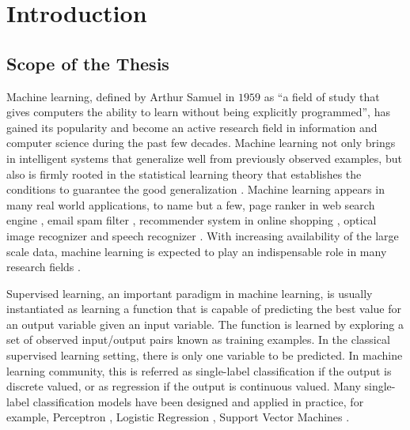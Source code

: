 




%
%
\chapter{Introduction}\label{ch_introduction}



%
%
\section{Scope of the Thesis}

Machine learning, defined by Arthur Samuel in $1959$ as ``a field of study that gives computers the ability to learn without being explicitly programmed'', has gained its popularity and become an active research field in information and computer science during the past few decades.
Machine learning not only brings in intelligent systems that generalize well from previously observed examples, but also is firmly rooted in the statistical learning theory that establishes the conditions to guarantee the good generalization \citep{Vapnik98statistical,Vapnik99an}.
Machine learning appears in many real world applications, to name but a few, page ranker in web search engine \citep{Richardson06beyond}, email spam filter \citep{Goodman06online}, recommender system in online shopping \citep{Bell07lessons}, optical image recognizer and speech recognizer \citep{Bengio09learning}.
With increasing availability of the large scale data, machine learning is expected to play an indispensable role in many research fields \citep{Fan13mining}.

Supervised learning, an important paradigm in machine learning, is usually instantiated as learning a function that is capable of predicting the best value for an output variable given an input variable.
The function is learned by exploring a set of observed input/output pairs known as training examples.
In the classical supervised learning setting, there is only one variable to be predicted.
In machine learning community, this is referred as single-label classification if the output is discrete valued, or as regression if the output is continuous valued.
Many single-label classification models have been designed and applied in practice, for example, Perceptron \citep{Rosenblatt58}, Logistic Regression \citep{Chen99}, Support Vector Machines \citep{Cortes95support}.

